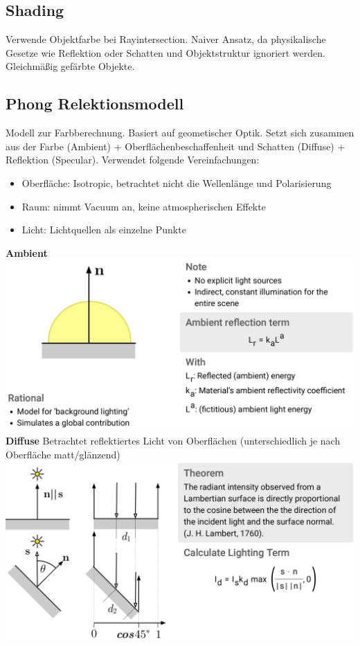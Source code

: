 \documentclass[12pt]{article}
\begin{document}
	\subsection{Shading}
	Verwende Objektfarbe bei Rayintersection. Naiver Ansatz, da physikalische Gesetze wie Reflektion oder Schatten und Objektstruktur ignoriert werden. Gleichmäßig gefärbte Objekte.

	\subsection{Phong Relektionsmodell}
	Modell zur Farbberechnung. Basiert auf geometischer Optik. Setzt sich zusammen aus der Farbe (Ambient) + Oberflächenbeschaffenheit und Schatten (Diffuse) + Reflektion (Specular). Verwendet folgende Vereinfachungen:
	\begin{itemize}
		\item Oberfläche: Isotropic, betrachtet nicht die Wellenlänge und Polarisierung
		\item Raum: nimmt Vacuum an, keine atmospherischen Effekte
		\item Licht: Lichtquellen als einzelne Punkte
	\end{itemize}
	\textbf{Ambient}\\
	\includegraphics[width=\linewidth]{figures/phong-ambient.png}\\
	\textbf{Diffuse} Betrachtet reflektiertes Licht von Oberflächen (unterschiedlich je nach Oberfläche matt/glänzend)\\
	\includegraphics[width=\linewidth]{figures/phong-diffuse.png}
\end{document}

